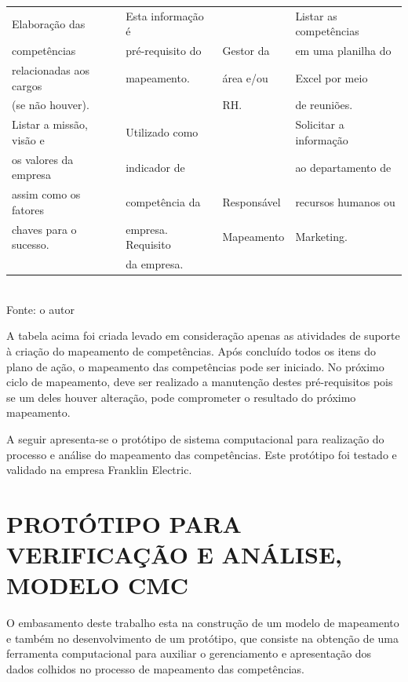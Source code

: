 \begin{quadro}[htbp]
\begin{tabular}{|l|l|l|l|}
		\hline
		Elaboração das     & Esta informação é                         &  &Listar as competências      \\
		competências        & pré-requisito do & Gestor da & em uma planilha do   \\
		relacionadas aos cargos   &	mapeamento.         & área e/ou               & Excel por meio\\
		(se não houver). &				&    RH.                   & de reuniões.\\
		\hline
		Listar a missão, visão e      & Utilizado como                          &  & Solicitar a informação       \\
		os valores da empresa         & indicador de  &  & ao departamento de    \\
		assim como os fatores    &	competência da          &  Responsável              & recursos humanos ou \\
		chaves para o sucesso. &	empresa. Requisito 			&    Mapeamento                  & Marketing.\\
		& da empresa. &    &\\
		\hline


	\end{tabular}
	\vspace{2mm}
	\\ \footnotesize Fonte: o autor
\end{quadro}

A tabela acima foi criada levado em consideração apenas as atividades de suporte à criação do mapeamento de competências. Após concluído todos os itens do plano de ação, o mapeamento das competências pode ser iniciado. No próximo ciclo de mapeamento, deve ser realizado a manutenção destes pré-requisitos pois se um deles houver alteração, pode comprometer o resultado do próximo mapeamento.

A seguir apresenta-se o protótipo de sistema computacional para realização do processo e análise do mapeamento das competências. Este protótipo foi testado e validado na empresa Franklin Electric.

\section{PROTÓTIPO PARA VERIFICAÇÃO E ANÁLISE, MODELO CMC}

O embasamento deste trabalho esta na construção de um modelo de mapeamento e também no desenvolvimento de um protótipo, que consiste na obtenção de uma ferramenta computacional para auxiliar o gerenciamento e apresentação dos dados colhidos no processo de mapeamento das competências.

